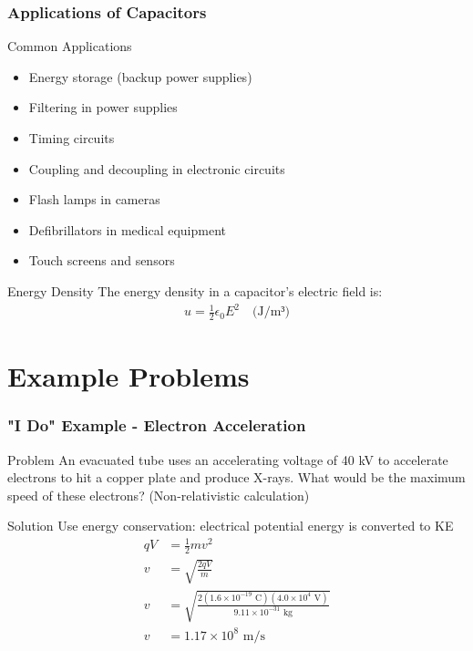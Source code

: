 \documentclass{beamer}
\begin{document}
\begin{frame}
    \frametitle{Applications of Capacitors}
    
    \begin{block}{Common Applications}
        \begin{itemize}
            \item Energy storage (backup power supplies)
            \item Filtering in power supplies
            \item Timing circuits
            \item Coupling and decoupling in electronic circuits
            \item Flash lamps in cameras
            \item Defibrillators in medical equipment
            \item Touch screens and sensors
        \end{itemize}
    \end{block}
    
    \begin{block}{Energy Density}
        The energy density in a capacitor's electric field is:
        \begin{align}
            u = \frac{1}{2}\epsilon_0 E^2 \quad \text{(J/m³)}
        \end{align}
    \end{block}
\end{frame}

\section{Example Problems}

\begin{frame}
    \frametitle{"I Do" Example - Electron Acceleration}
    
    \begin{block}{Problem}
        An evacuated tube uses an accelerating voltage of 40 kV to accelerate electrons to hit a copper plate and produce X-rays. What would be the maximum speed of these electrons? (Non-relativistic calculation)
    \end{block}
    
    \begin{block}{Solution}
        Use energy conservation: electrical potential energy is converted to KE
        \begin{align}
            qV &= \frac{1}{2}mv^2 \\
            v &= \sqrt{\frac{2qV}{m}} \\
            v &= \sqrt{\frac{2(1.6 \times 10^{-19} \text{ C})(4.0 \times 10^4 \text{ V})}{9.11 \times 10^{-31} \text{ kg}}} \\
            v &= 1.17 \times 10^8 \text{ m/s}
        \end{align}
    \end{block}
\end{frame}
\end{document}
